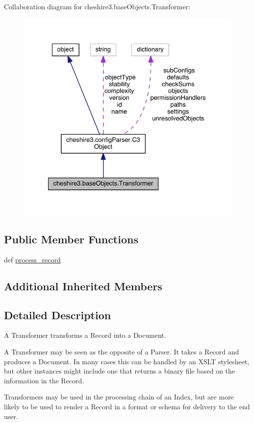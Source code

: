 Collaboration diagram for cheshire3.\-base\-Objects.\-Transformer\-:
\nopagebreak
\begin{figure}[H]
\begin{center}
\leavevmode
\includegraphics[width=331pt]{classcheshire3_1_1base_objects_1_1_transformer__coll__graph}
\end{center}
\end{figure}
\subsection*{Public Member Functions}
\begin{DoxyCompactItemize}
\item 
def \hyperlink{classcheshire3_1_1base_objects_1_1_transformer_a81ec3b97852df2dcd0c7cc1fed5d17c9}{process\-\_\-record}
\end{DoxyCompactItemize}
\subsection*{Additional Inherited Members}


\subsection{Detailed Description}
\begin{DoxyVerb}A Transformer transforms a Record into a Document.

A Transformer may be seen as the opposite of a Parser. It takes a Record
and produces a Document. In many cases this can be handled by an XSLT 
stylesheet, but other instances might include one that returns a binary 
file based on the information in the Record.

Transformers may be used in the processing chain of an Index, but are more 
likely to be used to render a Record in a format or schema for delivery to
the end user.
\end{DoxyVerb}
 

